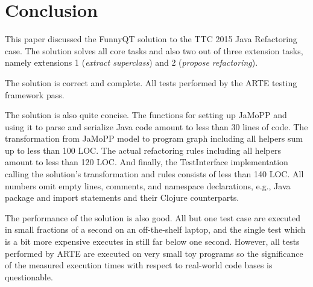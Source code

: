 \documentclass[submission]{eptcs}
\begin{document}
\section{Conclusion}
\label{sec:conclusion}

This paper discussed the FunnyQT solution to the TTC 2015 Java Refactoring
case.  The solution solves all core tasks and also two out of three extension
tasks, namely extensions 1 (\emph{extract superclass}) and 2 (\emph{propose
  refactoring}).

The solution is correct and complete.  All tests performed by the ARTE testing
framework pass.

The solution is also quite concise.  The functions for setting up JaMoPP and
using it to parse and serialize Java code amount to less than 30 lines of code.
The transformation from JaMoPP model to program graph including all helpers sum
up to less than 100 LOC.  The actual refactoring rules including all helpers
amount to less than 120 LOC.  And finally, the \textsf{TestInterface}
implementation calling the solution's transformation and rules consists of less
than 140 LOC.  All numbers omit empty lines, comments, and namespace
declarations, e.g., Java package and import statements and their Clojure
counterparts.

The performance of the solution is also good.  All but one test case are
executed in small fractions of a second on an off-the-shelf laptop, and the
single test which is a bit more expensive executes in still far below one
second.  However, all tests performed by ARTE are executed on very small toy
programs so the significance of the measured execution times with respect to
real-world code bases is questionable.



\end{document}
